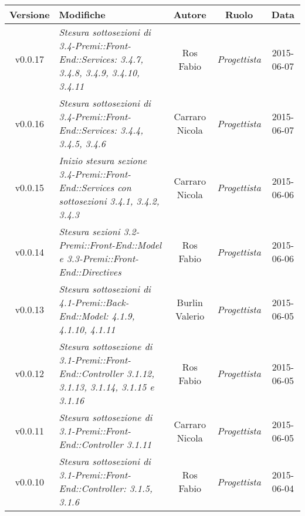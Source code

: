 \begin{table}[h]
	\centering
	\begin{tabular}{|c|p{}|c|c|c|}
		\toprule
			\textbf{Versione} & \textbf{Modifiche} & \textbf{Autore} & \textbf{Ruolo} & \textbf{Data}\\
		\midrule
		\midrule
			v0.0.17 & \textit{Stesura sottosezioni di 3.4-Premi::Front-End::Services: 3.4.7, 3.4.8, 3.4.9, 3.4.10, 3.4.11} & Ros Fabio & \textit{Progettista} & 2015-06-07\\
		\midrule
			v0.0.16 & \textit{Stesura sottosezioni di 3.4-Premi::Front-End::Services: 3.4.4, 3.4.5, 3.4.6} & Carraro Nicola & \textit{Progettista} & 2015-06-07\\
		\midrule
			v0.0.15 & \textit{Inizio stesura sezione 3.4-Premi::Front-End::Services con sottosezioni 3.4.1, 3.4.2, 3.4.3} & Carraro Nicola & \textit{Progettista} & 2015-06-06\\
		\midrule
			v0.0.14 & \textit{Stesura sezioni 3.2-Premi::Front-End::Model e 3.3-Premi::Front-End::Directives} & Ros Fabio & \textit{Progettista} & 2015-06-06\\
		\midrule
			v0.0.13 & \textit{Stesura sottosezioni di 4.1-Premi::Back-End::Model: 4.1.9, 4.1.10, 4.1.11} & Burlin Valerio & \textit{Progettista} & 2015-06-05\\
		\midrule
			v0.0.12 & \textit{Stesura sottosezione di 3.1-Premi::Front-End::Controller 3.1.12, 3.1.13, 3.1.14, 3.1.15 e 3.1.16} & Ros Fabio & \textit{Progettista} & 2015-06-05\\
		\midrule
			v0.0.11 & \textit{Stesura sottosezione di 3.1-Premi::Front-End::Controller 3.1.11} & Carraro Nicola & \textit{Progettista} & 2015-06-05\\
		\midrule
			v0.0.10 & \textit{Stesura sottosezioni di 3.1-Premi::Front-End::Controller: 3.1.5, 3.1.6} & Ros Fabio & \textit{Progettista} & 2015-06-04\\
		\bottomrule
	\end{tabular}
\end{table}

\newpage

